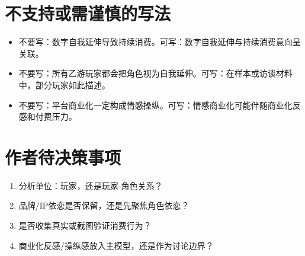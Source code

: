 \documentclass[UTF8,zihao=-4]{ctexart}
\begin{document}
\section{不支持或需谨慎的写法}
\begin{itemize}
\item 不要写：数字自我延伸导致持续消费。可写：数字自我延伸与持续消费意向呈关联。
\item 不要写：所有乙游玩家都会把角色视为自我延伸。可写：在样本或访谈材料中，部分玩家如此描述。
\item 不要写：平台商业化一定构成情感操纵。可写：情感商业化可能伴随商业化反感和付费压力。
\end{itemize}
\section{作者待决策事项}
\begin{enumerate}
\item 分析单位：玩家，还是玩家-角色关系？
\item 品牌/IP依恋是否保留，还是先聚焦角色依恋？
\item 是否收集真实或截图验证消费行为？
\item 商业化反感/操纵感放入主模型，还是作为讨论边界？
\end{enumerate}
\end{document}
